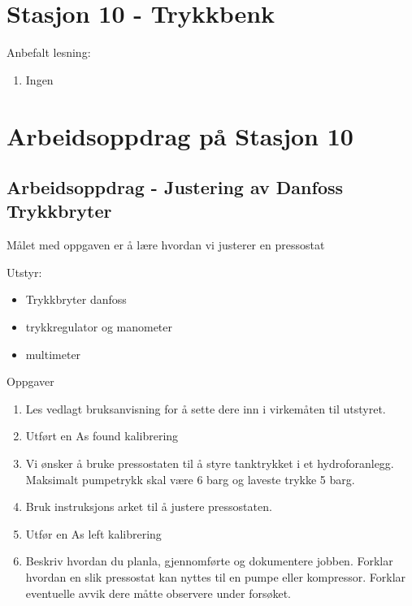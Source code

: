 
\noindent
\section*{Stasjon 10 - Trykkbenk}

\vskip 5pt
Anbefalt lesning:

\begin{enumerate}
	\item Ingen
\end{enumerate}




\section{Arbeidsoppdrag på Stasjon 10}

\subsection{Arbeidsoppdrag - Justering av Danfoss Trykkbryter}

Målet med oppgaven er å lære hvordan vi justerer en pressostat

Utstyr:
\begin{itemize}[noitemsep]
	\item Trykkbryter danfoss
	\item trykkregulator og manometer
	\item multimeter
\end{itemize}


Oppgaver \begin{enumerate}
	\item Les vedlagt bruksanvisning for å sette dere inn i virkemåten til utstyret.
	\item Utført en As found kalibrering 
	\item Vi ønsker å bruke pressostaten til å styre tanktrykket i et hydroforanlegg. Maksimalt pumpetrykk skal være 6 barg og laveste trykke 5 barg. 
	\item Bruk instruksjons arket til å justere pressostaten.
	\item Utfør en As left kalibrering 
	\item Beskriv hvordan du planla, gjennomførte og dokumentere jobben. Forklar hvordan en slik pressostat kan nyttes til en pumpe eller kompressor. Forklar eventuelle avvik dere måtte observere under forsøket. 
\end{enumerate}

